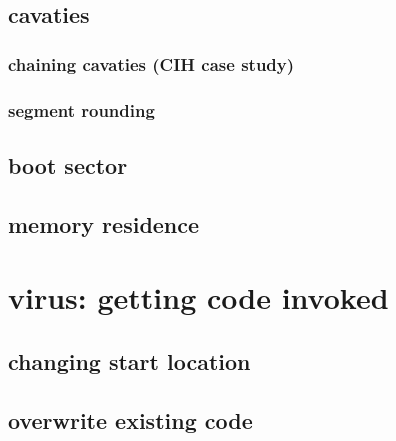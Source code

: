 \subsection{cavaties}




\subsubsection{chaining cavaties (CIH case study)}



\subsubsection{segment rounding}


\subsection{boot sector}



\subsection{memory residence}


\section{virus: getting code invoked}



\subsection{changing start location}



\subsection{overwrite existing code}

